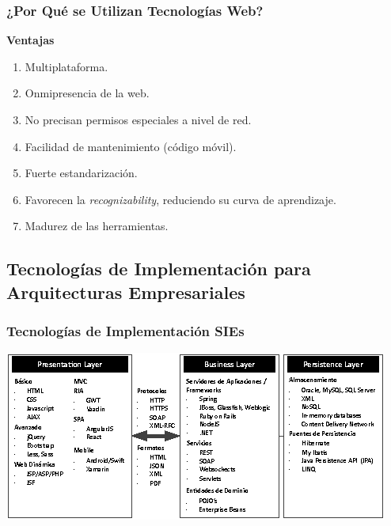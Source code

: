 \documentclass[a4paper,t,xcolor=pst,dvips,colortheme]{beamer}
\begin{document}
\begin{frame}[c]
	\frametitle{¿Por Qué se Utilizan Tecnologías Web?}
    \centering \textbf{Ventajas} \\
    \begin{enumerate}
        \item<2-> Multiplataforma.
        \item<3-> Onmipresencia de la web.
        \item<4-> No precisan permisos especiales a nivel de red.
        \item<5-> Facilidad de mantenimiento (código móvil).
        \item<6-> Fuerte estandarización.
        \item<7-> Favorecen la \emph{recognizability}, reduciendo su curva de aprendizaje.
        \item<8-> Madurez de las herramientas.
    \end{enumerate}
\end{frame}

\subsection[Tecnologías SIE]{Tecnologías de Implementación para Arquitecturas Empresariales}

\begin{frame}[c]
	\frametitle{Tecnologías de Implementación SIEs}
	\begin{center}
        \includegraphics[width=\linewidth,keepaspectratio=true]{images/enterpriseLayers/technologies.eps}
	\end{center}
\end{frame}
\end{document}

